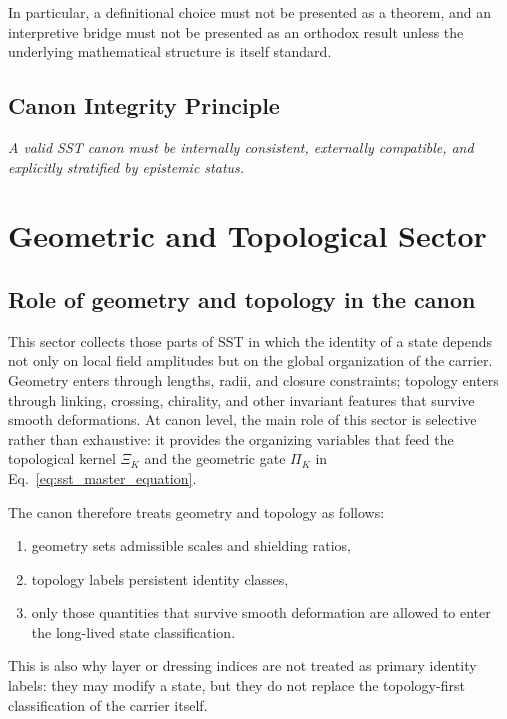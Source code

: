 \documentclass[11pt]{article}
\theoremstyle{definition}
\theoremstyle{plain}
\theoremstyle{remark}
\begin{document}
        In particular, a definitional choice must not be presented as a theorem, and an interpretive bridge must not be presented as an orthodox result unless the underlying mathematical structure is itself standard.
    
    \subsection{Canon Integrity Principle}
        
        \begin{center}
            \textit{A valid SST canon must be internally consistent, externally compatible, and explicitly stratified by epistemic status.}
        \end{center}

    \section{Geometric and Topological Sector}
        \label{sec:geometry}

    \subsection{Role of geometry and topology in the canon}
        This sector collects those parts of SST in which the identity of a state depends not only on local field amplitudes but on the global organization of the carrier. Geometry enters through lengths, radii, and closure constraints; topology enters through linking, crossing, chirality, and other invariant features that survive smooth deformations. At canon level, the main role of this sector is selective rather than exhaustive: it provides the organizing variables that feed the topological kernel $\Xi_K$ and the geometric gate $\Pi_K$ in Eq.~\eqref{eq:sst_master_equation}.

        The canon therefore treats geometry and topology as follows:
        \begin{enumerate}
            \item geometry sets admissible scales and shielding ratios,
            \item topology labels persistent identity classes,
            \item only those quantities that survive smooth deformation are allowed to enter the long-lived state classification.
        \end{enumerate}

        This is also why layer or dressing indices are not treated as primary identity labels: they may modify a state, but they do not replace the topology-first classification of the carrier itself.
\end{document}
